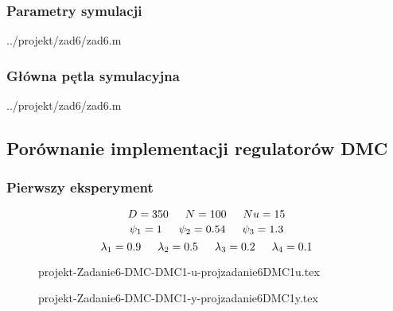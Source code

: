 \subsubsection{Parametry symulacji}

\ifdefined\CompileListings
    
        {../projekt/zad6/zad6.m}
    \newpage
\fi

\subsubsection{Główna pętla symulacyjna}

\ifdefined\CompileListings
    
        {../projekt/zad6/zad6.m}
\fi
\newpage

\subsection{Porównanie implementacji regulatorów DMC}

\subsubsection{Pierwszy eksperyment}
$$D=350 \indent  N=100 \indent  Nu=15$$ 
$$\psi_1=\num{1} \indent \psi_2=\num{0.54} \indent \psi_3=\num{1.3}$$
$$\lambda_1=\num{0.9} \indent \lambda_2=\num{0.5} \indent \lambda_3=\num{0.2} \indent \lambda_4=\num{0.1}$$



\ifdefined\CompileFigures
    \begin{figure}[H] 
            \centering
            
            \caption{projekt-Zadanie6-DMC-DMC1-u-projzadanie6DMC1u.tex}
            \label{projekt:zad6:figure:projzadanie6DMC1u}
    \end{figure}
\fi


\ifdefined\CompileFigures
    \begin{figure}[H] 
            \centering
            
            \caption{projekt-Zadanie6-DMC-DMC1-y-projzadanie6DMC1y.tex}
            \label{projekt:zad6:figure:projzadanie6DMC1y}
    \end{figure}
\fi

